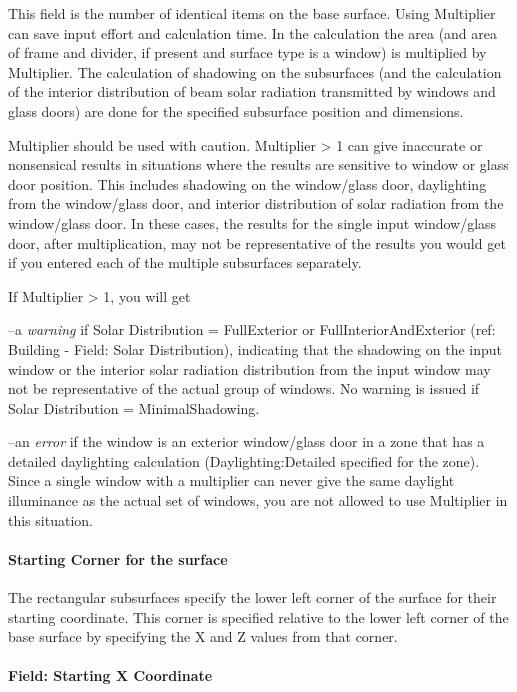 This field is the number of identical items on the base surface. Using Multiplier can save input effort and calculation time. In the calculation the area (and area of frame and divider, if present and surface type is a window) is multiplied by Multiplier. The calculation of shadowing on the subsurfaces (and the calculation of the interior distribution of beam solar radiation transmitted by windows and glass doors) are done for the specified subsurface position and dimensions.

Multiplier should be used with caution. Multiplier \textgreater{} 1 can give inaccurate or nonsensical results in situations where the results are sensitive to window or glass door position. This includes shadowing on the window/glass door, daylighting from the window/glass door, and interior distribution of solar radiation from the window/glass door. In these cases, the results for the single input window/glass door, after multiplication, may not be representative of the results you would get if you entered each of the multiple subsurfaces separately.

If Multiplier \textgreater{} 1, you will get

--a \emph{warning} if Solar Distribution = FullExterior or FullInteriorAndExterior (ref: Building - Field: Solar Distribution), indicating that the shadowing on the input window or the interior solar radiation distribution from the input window may not be representative of the actual group of windows. No warning is issued if Solar Distribution = MinimalShadowing.

--an \emph{error} if the window is an exterior window/glass door in a zone that has a detailed daylighting calculation (Daylighting:Detailed specified for the zone). Since a single window with a multiplier can never give the same daylight illuminance as the actual set of windows, you are not allowed to use Multiplier in this situation.

\paragraph{Starting Corner for the surface}\label{starting-corner-for-the-surface-14}

The rectangular subsurfaces specify the lower left corner of the surface for their starting coordinate. This corner is specified relative to the lower left corner of the base surface by specifying the X and Z values from that corner.

\paragraph{Field: Starting X Coordinate}\label{field-starting-x-coordinate-14}

